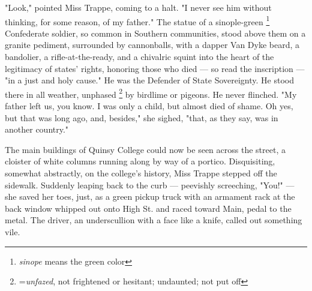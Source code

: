   "Look," pointed Miss Trappe, coming to a halt. "I never see him without
thinking, for some reason, of my father." The statue of a sinople-green
\footnote{ \textit{sinope} means the green color}
Confederate soldier, so common in Southern communities, stood above them on a
granite pediment, 
surrounded by cannonballs, with a dapper 
Van Dyke beard, a bandolier, 
a rifle-at-the-ready, and a chivalric 
squint 
into the heart of the
legitimacy of states' rights, honoring those who died --- so read the
inscription --- "in a just and holy cause." He was the Defender of State
Sovereignty. He stood there in all weather, unphased 
\footnote{ =\textit{unfazed}, not frightened or hesitant; undaunted; not put off}
by birdlime 
or pigeons. He never flinched. 
"My father left us, you know. I was only a child, but almost
died of shame. Oh yes, but that was long ago, and, besides," she sighed, "that,
as they say, was in another country."

  The main buildings of Quinsy College could now be seen across the street, a
cloister 
of white columns running along by way of a portico. Disquisiting,
somewhat abstractly, on the college's history, Miss Trappe stepped off the
sidewalk. Suddenly leaping back to the curb --- peevishly 
screeching, 
"You!" --- she saved her toes, just, as a green pickup truck with an armament 
rack at the back window whipped out onto High St. and raced toward Main, pedal 
to the metal. The driver, an underscullion 
with a face like a knife, called out something vile.

